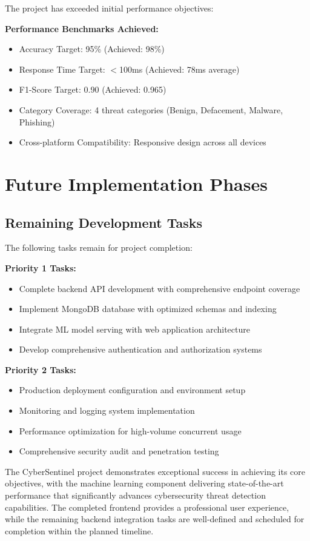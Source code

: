 The project has exceeded initial performance objectives:

\textbf{Performance Benchmarks Achieved:}
\begin{itemize}
	\item Accuracy Target: 95\% (Achieved: 98\%)
	\item Response Time Target: $<$100ms (Achieved: 78ms average)
	\item F1-Score Target: 0.90 (Achieved: 0.965)
	\item Category Coverage: 4 threat categories (Benign, Defacement, Malware, Phishing)
	\item Cross-platform Compatibility: Responsive design across all devices
\end{itemize}

\section{Future Implementation Phases}

\subsection{Remaining Development Tasks}

The following tasks remain for project completion:

\textbf{Priority 1 Tasks:}
\begin{itemize}
	\item Complete backend API development with comprehensive endpoint coverage
	\item Implement MongoDB database with optimized schemas and indexing
	\item Integrate ML model serving with web application architecture
	\item Develop comprehensive authentication and authorization systems
\end{itemize}

\textbf{Priority 2 Tasks:}
\begin{itemize}
	\item Production deployment configuration and environment setup
	\item Monitoring and logging system implementation
	\item Performance optimization for high-volume concurrent usage
	\item Comprehensive security audit and penetration testing
\end{itemize}

The CyberSentinel project demonstrates exceptional success in achieving its core objectives, with the machine learning component delivering state-of-the-art performance that significantly advances cybersecurity threat detection capabilities. The completed frontend provides a professional user experience, while the remaining backend integration tasks are well-defined and scheduled for completion within the planned timeline.

